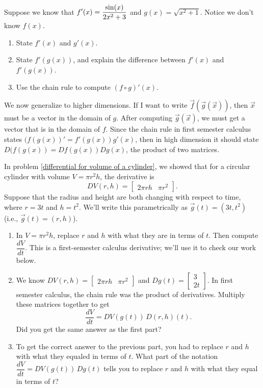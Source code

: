\begin{problem}\label{chain rule review problem}
 Suppose we know that $\displaystyle f'(x) = \frac{\sin(x)}{2x^2+3}$ and $g(x)=\sqrt{x^2+1}$. Notice we don't know $f(x)$. 
\begin{enumerate}
 \item State $f'(x)$ and $g'(x)$.
 \item State $f'(g(x))$, and explain the difference between $f'(x)$ and $f'(g(x))$. 
 \item Use the chain rule to compute $(f\circ g)'(x)$. 
\end{enumerate}
\end{problem}

We now generalize to higher dimensions. If I want to write $\vec f(\vec g(\vec x))$, then $\vec x$ must be a vector in the domain of $g$.  After computing $\vec g(\vec x)$, we must get a vector that is in the domain of $f$.  Since the chain rule in first semester calculus states $(f(g(x))'=f'(g(x))g'(x)$, then in high dimension it should state $D(f(g(x)) = Df(g(x))Dg(x)$, the product of two matrices. 

\begin{problem}
 In problem \ref{differential for volume of a cylinder}, we showed that for a circular cylinder with volume $V=\pi r^2 h$, the derivative is 
$$DV(r,h)=\begin{bmatrix}
2\pi rh & \pi r^2
\end{bmatrix}.$$  
Suppose that the radius and height are both changing with respect to time, where $r=3t$ and $h=t^2$. We'll write this parametrically as $\vec g(t) =(3t, t^2)$ (i.e., $\vec g(t)=(r,h)$).
\begin{enumerate}
 \item In $V=\pi r^2 h$, replace $r$ and $h$ with what they are in terms of $t$. Then compute $\dfrac{dV}{dt}$. This is a first-semester calculus derivative; we'll use it to check our work below.
 \item We know 
$DV(r,h)=\begin{bmatrix}
2\pi rh & \pi r^2
\end{bmatrix}$ and
$Dg(t)=
\begin{bmatrix}
3\\  2t
\end{bmatrix}.$
In first semester calculus, the chain rule was the product of derivatives. Multiply these matrices together to get $$\dfrac{dV}{dt}=DV(g(t))\, D(r,h)(t).$$ Did you get the same answer as the first part? 
 \item To get the correct answer to the previous part, you had to replace $r$ and $h$ with what they equaled in terms of $t$.  What part of the notation $\dfrac{dV}{dt}=DV(g(t))\, Dg(t)$ tells you to replace $r$ and $h$ with what they equal in terms of $t$?
\end{enumerate}



\end{problem}


